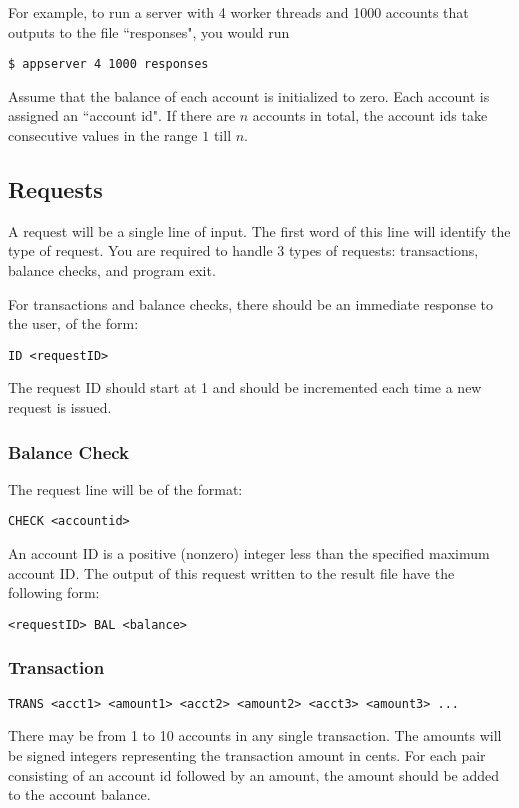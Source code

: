 \documentclass[letterpaper,10pt]{article}
\begin{document}
For example, to run a server with 4 worker threads and 1000 accounts that outputs to the file ``responses", you would run

\begin{verbatim}
$ appserver 4 1000 responses
\end{verbatim}

Assume that the balance of each account is initialized to zero. Each account is assigned an ``account id".
If there are $n$ accounts in total, the account ids take consecutive values in the range $1$ till $n$.


\subsection{Requests}
A request will be a single line of input. The first word of this line
will identify the type of request. You
are required to handle 3 types of requests: transactions, balance checks, and program exit.

For transactions and balance checks, there should be an immediate response to the user, of the form:
\begin{verbatim}
ID <requestID>
\end{verbatim}
The request ID should start at 1 and should be incremented each time a new request is issued.

\subsubsection{Balance Check}
The request line will be of the format:
\begin{verbatim}
CHECK <accountid>
\end{verbatim}
An account ID is a positive (nonzero) integer less than the specified
maximum account ID. The output of this request written to the result file have the following form:
\begin{verbatim}
<requestID> BAL <balance>
\end{verbatim}

\subsubsection{Transaction}
\begin{verbatim}
TRANS <acct1> <amount1> <acct2> <amount2> <acct3> <amount3> ...
\end{verbatim}
There may be from 1 to 10 accounts in any single transaction.
The amounts will be signed integers representing the transaction amount in cents.
For each pair consisting of an account id followed by an amount, the amount
should be added to the account balance.
\end{document}
